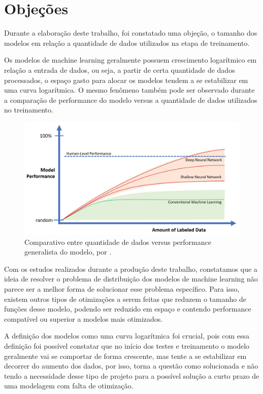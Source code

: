 
\chapter{\textbf{Objeções}} %

Durante a elaboração deste trabalho, foi constatado uma objeção, o tamanho dos modelos em relação a quantidade de dados utilizados na etapa de treinamento. \par
Os modelos de machine learning geralmente possuem crescimento logarítmico em relação a entrada de dados, ou seja, a partir de certa quantidade de dados processados, o espaço gasto para alocar os modelos tendem a se estabilizar em uma curva logarítmica. O mesmo fenômeno também pode ser observado durante a comparação de performance do modelo versus a quantidade de dados utilizados no treinamento.\par

\begin{figure}[h!]
	\includegraphics[width=\linewidth]{topics/dataperform.jpeg}
	\caption{Comparativo entre quantidade de dados versus performance generalista do modelo, por \cite{Hackathorn2018}.}
	\label{fig:dataperformgraph}
\end{figure}

Com os estudos realizados durante a produção deste trabalho, constatamos que a ideia de resolver o problema de distribuição dos modelos de machine learning não parece ser a melhor forma de solucionar esse problema específico. Para isso, existem outros tipos de otimizações a serem feitas que reduzem o tamanho de funções desse modelo, podendo ser reduzido em espaço e contendo performance compatível ou superior a modelos mais otimizados. \par
A definição dos modelos como uma curva logarítmica foi crucial, pois com essa definição foi possível constatar que no início dos testes e treinamento o modelo geralmente vai se comportar de forma crescente, mas tente a se estabilizar em decorrer do aumento dos dados, por isso, torna a questão como solucionada e não tendo a necessidade desse tipo de projeto para a possível solução a curto prazo de uma modelagem com falta de otimização.\par
